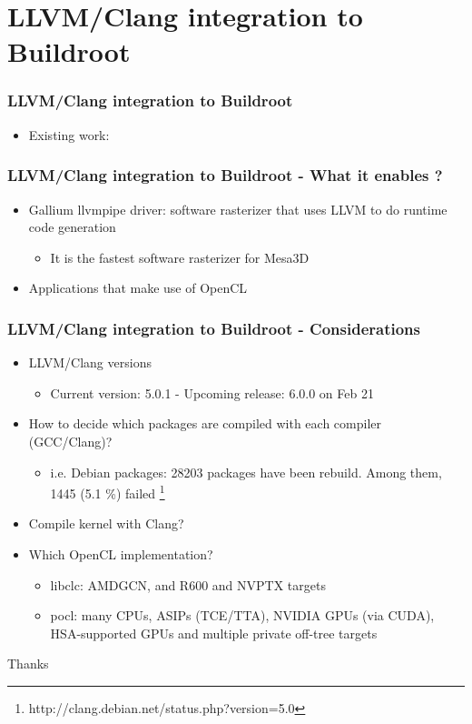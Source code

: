 \documentclass{beamer}
\begin{document}
\section{LLVM/Clang integration to Buildroot}

\begin{frame}
\frametitle{LLVM/Clang integration to Buildroot}
\begin{itemize}
  \item Existing work:
\end{itemize}
\end{frame}

\begin{frame}
\frametitle{LLVM/Clang integration to Buildroot - What it enables ?}
\begin{itemize}
  \item Gallium llvmpipe driver: software rasterizer that uses LLVM to do runtime code generation
  \begin{itemize}
    \item It is the fastest software rasterizer for Mesa3D
  \end{itemize}
  \item Applications that make use of OpenCL
\end{itemize}
\end{frame}

\begin{frame}
\frametitle{LLVM/Clang integration to Buildroot - Considerations}
\begin{itemize}
  \item LLVM/Clang versions
  \begin{itemize}
    \item Current version: 5.0.1 - Upcoming release: 6.0.0 on Feb 21
  \end{itemize}
  \item How to decide which packages are compiled with each compiler (GCC/Clang)?
  \begin{itemize}
    \item i.e. Debian packages: 28203 packages have been rebuild. Among them, 1445 (5.1 \%) failed \footnote{http://clang.debian.net/status.php?version=5.0}
  \end{itemize}
  \item Compile kernel with Clang?
  \item Which OpenCL implementation?
  \begin{itemize}
    \item {\selectfont libclc}: AMDGCN, and R600 and NVPTX targets
    \item {\selectfont pocl}: many CPUs, ASIPs (TCE/TTA), NVIDIA GPUs (via CUDA), HSA-supported GPUs and multiple private off-tree targets
  \end{itemize}
\end{itemize}
\end{frame}
\begin{frame}
\Huge{\centerline{Thanks}}
\end{frame}
\end{document}
